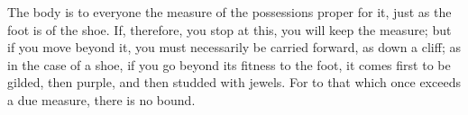 The body is to  everyone the measure of the possessions proper  for it, just as
the foot  is of the shoe.  If, therefore, you stop  at this, you will  keep the
measure; but if you move beyond it, you must necessarily be carried forward, as
down a cliff;  as in the case  of a shoe, if  you go beyond its  fitness to the
foot, it comes first  to be gilded, then purple, and  then studded with jewels.
For to that which once exceeds a due measure, there is no bound.
